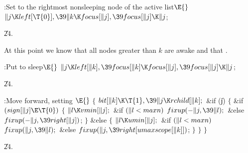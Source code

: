 \B{}:Set  to the rightmost nonsleeping node of
the active list\X${}\E{}$\6
$\|j\K\\{left}[\T{0}],\39\|k\K\\{focus}[\|j],\39\\{focus}[\|j]\K\|j{}$;\par
\U24.\fi

At this point we know that all nodes greater than $k$ are
awake and
that .

\Y\B\4:Put  to sleep\X${}\E{}$\6
$\|j\K\\{left}[\|k],\39\\{focus}[\|k]\K\\{focus}[\|j],\39\\{focus}[\|j]\K%
\|j{}$;\par
\U24.\fi

\B{}:Move forward, setting %
\X${}\E{}$\6
${}\{{}$\1\6
${}\\{bit}[\|k]\K\T{1},\39\|j\K\\{rchild}[\|k];{}$\6
\&{if} (\|j)\5
${}\{{}$\1\6
\&{if} ${}(\\{sign}[\|j]\E\T{0}){}$\5
${}\{{}$\1\6
${}\|l\K\\{vmin}[\|j];{}$\6
\&{if} ${}(\|l<\\{maxn}){}$\1\5
${}\\{fixup}({-}\|j,\39\|l);{}$\2\6
\&{else}\1\5
${}\\{fixup}({-}\|j,\39\\{right}[\|j]){}$;\2\6
\4${}\}{}$\5
\2\&{else}\5
${}\{{}$\1\6
${}\|l\K\\{umin}[\|j];{}$\6
\&{if} ${}(\|l<\\{maxn}){}$\1\5
${}\\{fixup}(\|j,\39\|l);{}$\2\6
\&{else}\1\5
${}\\{fixup}(\|j,\39\\{right}[\\{umaxscope}[\|k]]){}$;\2\6
\4${}\}{}$\2\6
\4${}\}{}$\2\6
\4${}\}{}$\2\par
\U24.\fi

